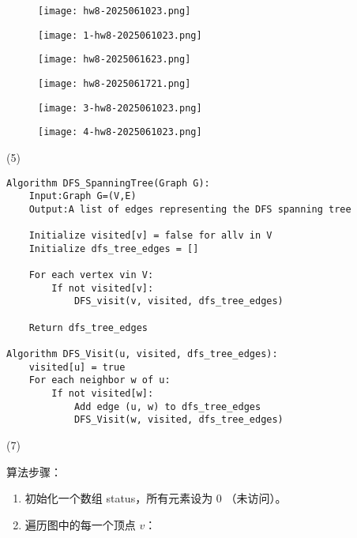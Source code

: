 \begin{exercise}
\begin{figure}[H]
\centering
\texttt{[image: hw8-2025061023.png]}
\label{}
\end{figure}
\begin{figure}[H]
\centering
\texttt{[image: 1-hw8-2025061023.png]}
\label{}
\end{figure}
\end{exercise}
\begin{figure}[H]
\centering
\texttt{[image: hw8-2025061623.png]}
\label{}
\end{figure}

\begin{figure}[H]
\centering
\texttt{[image: hw8-2025061721.png]}
\label{}
\end{figure}

\begin{exercise}
\begin{figure}[H]
\centering
\texttt{[image: 3-hw8-2025061023.png]}
\label{}
\end{figure}
\begin{figure}[H]
\centering
\texttt{[image: 4-hw8-2025061023.png]}
\label{}
\end{figure}
\end{exercise}
(5)

\begin{lstlisting}
Algorithm DFS_SpanningTree(Graph G):
    Input:Graph G=(V,E)
	Output:A list of edges representing the DFS spanning tree
	
	Initialize visited[v] = false for allv in V
	Initialize dfs_tree_edges = []
	
	For each vertex vin V:
	    If not visited[v]:    
	        DFS_visit(v, visited, dfs_tree_edges)
	        
	Return dfs_tree_edges
	
Algorithm DFS_Visit(u, visited, dfs_tree_edges):
	visited[u] = true
	For each neighbor w of u:
	    If not visited[w]:
	        Add edge (u, w) to dfs_tree_edges
	        DFS_Visit(w, visited, dfs_tree_edges)
\end{lstlisting}
(7)

算法步骤：

\begin{enumerate}
	\item 初始化一个数组 status，所有元素设为 0 （未访问）。
	\item 遍历图中的每一个顶点 $v$：
\end{enumerate}


